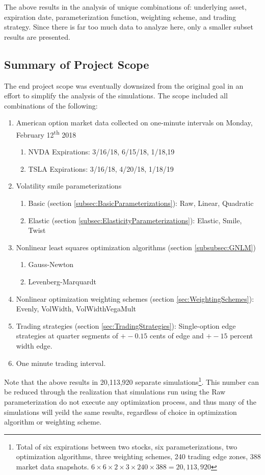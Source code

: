 \documentclass[12pt, a4paper, notitlepage]{article}
\numberwithin{equation}{subsection}
\numberwithin{figure}{subsection}
\numberwithin{table}{subsection}
\begin{document}
The above results in the analysis of unique combinations of: underlying asset, expiration date, parameterization function, weighting scheme, and trading strategy.  Since there is far too much data to analyze here, only a smaller subset results are presented.

\subsection{Summary of Project Scope}
The end project scope was eventually downsized from the original goal in an effort to simplify the analysis of the simulations. The scope included all combinations of the following:

\begin{enumerate}
    \item American option market data collected on one-minute intervals on Monday, February 12\textsuperscript{th} 2018
    \begin{enumerate}
        \item NVDA Expirations:  3/16/18, 6/15/18, 1/18,19
        \item TSLA Expirations:  3/16/18, 4/20/18, 1/18/19
    \end{enumerate}
    \item Volatility smile parameterizations
    \begin{enumerate}
        \item Basic (section \ref{subsec:BasicParameterizations}):  Raw, Linear, Quadratic
        \item Elastic (section \ref{subsec:ElasticityParameterizations}): Elastic, Smile, Twist
    \end{enumerate}
    \item Nonlinear least squares optimization algorithms (section \ref{subsubsec:GNLM})
    \begin{enumerate}
        \item Gauss-Newton
        \item Levenberg-Marquardt
    \end{enumerate}
    \item Nonlinear optimization weighting schemes (section \ref{sec:WeightingSchemes}): Evenly, VolWidth, VolWidthVegaMult
    \item Trading strategies (section \ref{sec:TradingStrategies}):  Single-option edge strategies at quarter segments of $+-0.15$ cents of edge and $+-15$ percent width edge.
    \item One minute trading interval.
\end{enumerate}
Note that the above results in 20,113,920 separate simulations\footnote{Total of six expirations between two stocks, six parameterizations, two optimization algorithms, three weighting schemes, 240 trading edge zones, 388 market data snapshots.  $6 \times 6 \times 2 \times 3 \times 240 \times 388 = 20,113,920$}.  This number can be reduced through the realization that simulations run using the Raw parameterization do not execute any optimization process, and thus many of the simulations will yeild the same results, regardless of choice in optimization algorithm or weighting scheme.
\end{document}
